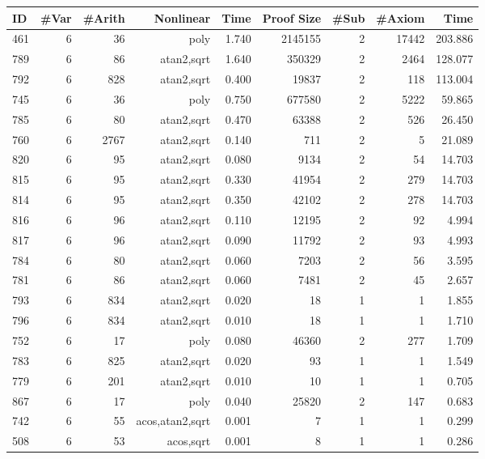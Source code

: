 \begin{table*}[t!h!]
  \begin{center}
\begin{tabular}{|l||r|r|r||r|r|r|r|r|}
\hline
ID & \#Var & \#Arith & Nonlinear & Time & Proof Size & \#Sub & \#Axiom & Time \\
\hline
\hline
461 & 6 & 36 & poly & 1.740 & 2145155 & 2 & 17442 & 203.886 \\
\hline
789 & 6 & 86 & atan2,sqrt & 1.640 & 350329 & 2 & 2464 & 128.077 \\
\hline
792 & 6 & 828 & atan2,sqrt & 0.400 & 19837 & 2 & 118 & 113.004 \\
\hline
745 & 6 & 36 & poly & 0.750 & 677580 & 2 & 5222 & 59.865 \\
\hline
785 & 6 & 80 & atan2,sqrt & 0.470 & 63388 & 2 & 526 & 26.450 \\
\hline
760 & 6 & 2767 & atan2,sqrt & 0.140 & 711 & 2 & 5 & 21.089 \\
\hline
820 & 6 & 95 & atan2,sqrt & 0.080 & 9134 & 2 & 54 & 14.703 \\
\hline
815 & 6 & 95 & atan2,sqrt & 0.330 & 41954 & 2 & 279 & 14.703 \\
\hline
814 & 6 & 95 & atan2,sqrt & 0.350 & 42102 & 2 & 278 & 14.703 \\
\hline
816 & 6 & 96 & atan2,sqrt & 0.110 & 12195 & 2 & 92 & 4.994 \\
\hline
817 & 6 & 96 & atan2,sqrt & 0.090 & 11792 & 2 & 93 & 4.993 \\
\hline
784 & 6 & 80 & atan2,sqrt & 0.060 & 7203 & 2 & 56 & 3.595 \\
\hline
781 & 6 & 86 & atan2,sqrt & 0.060 & 7481 & 2 & 45 & 2.657 \\
\hline
793 & 6 & 834 & atan2,sqrt & 0.020 & 18 & 1 & 1 & 1.855 \\
\hline
796 & 6 & 834 & atan2,sqrt & 0.010 & 18 & 1 & 1 & 1.710 \\
\hline
752 & 6 & 17 &  poly & 0.080 & 46360 & 2 & 277 & 1.709 \\
\hline
783 & 6 & 825 &atan2,sqrt & 0.020 & 93 & 1 & 1 & 1.549 \\
\hline
779 & 6 & 201 & atan2,sqrt & 0.010 & 10 & 1 & 1 & 0.705 \\
\hline
867 & 6 & 17 &  poly & 0.040 & 25820 & 2 & 147 & 0.683 \\
\hline
742 & 6 & 55 & acos,atan2,sqrt & 0.001 & 7 & 1 & 1 & 0.299 \\
\hline
508 & 6 & 53 & acos,sqrt & 0.001 & 8 & 1 & 1 & 0.286 \\

\end{tabular}
\end{center}
\end{table*}
